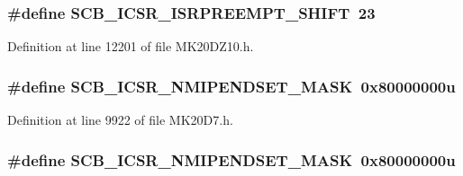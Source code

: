 \subsubsection[{\texorpdfstring{S\+C\+B\+\_\+\+I\+C\+S\+R\+\_\+\+I\+S\+R\+P\+R\+E\+E\+M\+P\+T\+\_\+\+S\+H\+I\+FT}{SCB_ICSR_ISRPREEMPT_SHIFT}}]{\setlength{\rightskip}{0pt plus 5cm}\#define S\+C\+B\+\_\+\+I\+C\+S\+R\+\_\+\+I\+S\+R\+P\+R\+E\+E\+M\+P\+T\+\_\+\+S\+H\+I\+FT~23}\hypertarget{group___s_c_b___register___masks_gafc9c373a4862603c06eaade5503d9fc7}{}\label{group___s_c_b___register___masks_gafc9c373a4862603c06eaade5503d9fc7}


Definition at line 12201 of file M\+K20\+D\+Z10.\+h.

\subsubsection[{\texorpdfstring{S\+C\+B\+\_\+\+I\+C\+S\+R\+\_\+\+N\+M\+I\+P\+E\+N\+D\+S\+E\+T\+\_\+\+M\+A\+SK}{SCB_ICSR_NMIPENDSET_MASK}}]{\setlength{\rightskip}{0pt plus 5cm}\#define S\+C\+B\+\_\+\+I\+C\+S\+R\+\_\+\+N\+M\+I\+P\+E\+N\+D\+S\+E\+T\+\_\+\+M\+A\+SK~0x80000000u}\hypertarget{group___s_c_b___register___masks_gab2a6cb5708895a81ec8826b8fa546145}{}\label{group___s_c_b___register___masks_gab2a6cb5708895a81ec8826b8fa546145}


Definition at line 9922 of file M\+K20\+D7.\+h.

\subsubsection[{\texorpdfstring{S\+C\+B\+\_\+\+I\+C\+S\+R\+\_\+\+N\+M\+I\+P\+E\+N\+D\+S\+E\+T\+\_\+\+M\+A\+SK}{SCB_ICSR_NMIPENDSET_MASK}}]{\setlength{\rightskip}{0pt plus 5cm}\#define S\+C\+B\+\_\+\+I\+C\+S\+R\+\_\+\+N\+M\+I\+P\+E\+N\+D\+S\+E\+T\+\_\+\+M\+A\+SK~0x80000000u}\hypertarget{group___s_c_b___register___masks_gab2a6cb5708895a81ec8826b8fa546145}{}\label{group___s_c_b___register___masks_gab2a6cb5708895a81ec8826b8fa546145}


